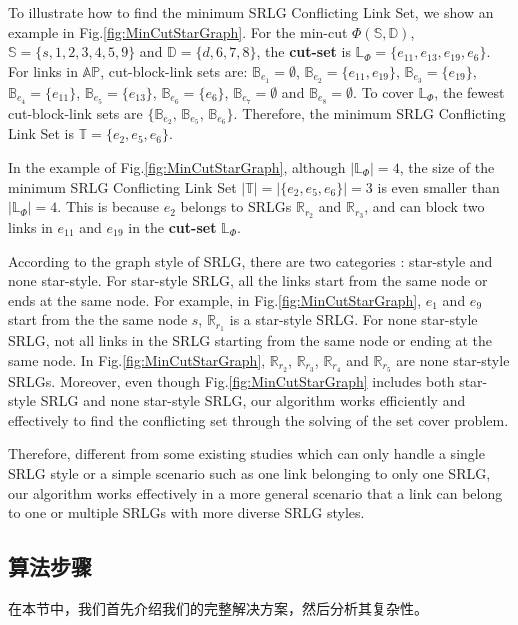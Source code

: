 To illustrate how to find the minimum SRLG Conflicting Link Set, we show an example in Fig.\ref{fig:MinCutStarGraph}. For the min-cut $\Phi(\mathbb{S},\mathbb{D})$, $\mathbb{S}=\{s, 1, 2, 3, 4, 5, 9\}$ and $\mathbb{D}=\{d, 6, 7, 8\}$, the \textbf{cut-set} is $\mathbb{L}_{\Phi}=\{e_{11},e_{13},e_{19},e_{6}\}$. For links in $\mathbb{AP}$,  cut-block-link sets are: $\mathbb{B}_{e_1}=\emptyset$, $\mathbb{B}_{e_2}=\{e_{11},e_{19}\}$, $\mathbb{B}_{e_3}=\{e_{19}\}$, $\mathbb{B}_{e_4}=\{e_{11}\}$, $\mathbb{B}_{e_5}=\{e_{13}\}$, $\mathbb{B}_{e_6}=\{e_6\}$, $\mathbb{B}_{e_7}=\emptyset$ and $\mathbb{B}_{e_8}=\emptyset$. To cover $\mathbb{L}_{\Phi}$, the fewest cut-block-link sets are $\{\mathbb{B}_{e_2}$, $\mathbb{B}_{e_5}$, $\mathbb{B}_{e_6}\}$. Therefore, the minimum SRLG Conflicting Link Set is $\mathbb{T}=\{e_2, e_5, e_6 \}$.

In the example of Fig.\ref{fig:MinCutStarGraph}, although $|\mathbb{L}_{\Phi}|=4$, the size of  the minimum SRLG Conflicting Link Set $|\mathbb{T}|=|\{e_2, e_5, e_6 \}|=3$ is even smaller than $|\mathbb{L}_{\Phi}|=4$. This is because $e_2$ belongs to   SRLGs $\mathbb{R}_{r_2}$ and $\mathbb{R}_{r_3}$, and can block two links in $e_{11}$ and  $e_{19}$ in the \textbf{cut-set} $\mathbb{L}_{\Phi}$.

According to the graph style of SRLG, there are two categories \cite{datta2008graph}:  star-style and none star-style. For star-style SRLG, all the links start from the same node or ends at the same node. For example, in Fig.\ref{fig:MinCutStarGraph}, $e_1$ and $e_9$ start from the  the same node $s$, $\mathbb{R}_{r_1}$ is a star-style SRLG.  For none star-style SRLG, not all links in the SRLG starting from the same node or ending at the same node. In Fig.\ref{fig:MinCutStarGraph}, $\mathbb{R}_{r_2}$, $\mathbb{R}_{r_3}$, $\mathbb{R}_{r_4}$ and $\mathbb{R}_{r_5}$ are none star-style SRLGs.
Moreover, even though Fig.\ref{fig:MinCutStarGraph} includes both  star-style SRLG  and none star-style SRLG,  our  algorithm works efficiently and effectively to find the conflicting set through the solving of the set cover problem.

Therefore, different from some existing studies \cite{datta2008graph} which can only handle a single SRLG style or a simple scenario such as  one link belonging to only one SRLG, our algorithm works effectively in a more  general scenario that a link can belong to one or multiple SRLGs with more diverse SRLG styles.



\subsection{算法步骤}
在本节中，我们首先介绍我们的完整解决方案，然后分析其复杂性。

